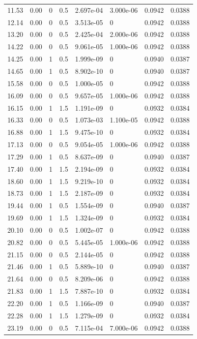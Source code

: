 \documentclass[preview]{standalone}
\begin{document}
{{\begin{tabular}{L{1.2cm}C{1.2cm} C{0.3cm}C{0.5cm} C{1.4cm}C{1.4cm} C{1.4cm}C{1.4cm}}
  11.53  &  0.00  & 0     & 0.5 &  2.697e-04  & 3.000e-06  & 0.0942 &  0.0388   \\ 
  12.14  &  0.00  & 0     & 0.5 &  3.513e-05  & 0  & 0.0942 &  0.0388   \\ 
  13.20  &  0.00  & 0     & 0.5 &  2.425e-04  & 2.000e-06  & 0.0942 &  0.0388   \\ 
  14.22  &  0.00  & 0     & 0.5 &  9.061e-05  & 1.000e-06  & 0.0942 &  0.0388   \\ 
  14.25  &  0.00  & 1     & 0.5 &  1.999e-09  & 0  & 0.0940 &  0.0387   \\ 
  14.65  &  0.00  & 1     & 0.5 &  8.902e-10  & 0  & 0.0940 &  0.0387   \\ 
  15.58  &  0.00  & 0     & 0.5 &  1.000e-05  & 0  & 0.0942 &  0.0388   \\ 
  16.09  &  0.00  & 0     & 0.5 &  9.657e-05  & 1.000e-06  & 0.0942 &  0.0388   \\ 
  16.15  &  0.00  & 1     & 1.5 &  1.191e-09  & 0  & 0.0932 &  0.0384   \\ 
  16.33  &  0.00  & 0     & 0.5 &  1.073e-03  & 1.100e-05  & 0.0942 &  0.0388   \\ 
  16.88  &  0.00  & 1     & 1.5 &  9.475e-10  & 0  & 0.0932 &  0.0384   \\ 
  17.13  &  0.00  & 0     & 0.5 &  9.054e-05  & 1.000e-06  & 0.0942 &  0.0388   \\ 
  17.29  &  0.00  & 1     & 0.5 &  8.637e-09  & 0  & 0.0940 &  0.0387   \\ 
  17.40  &  0.00  & 1     & 1.5 &  2.194e-09  & 0  & 0.0932 &  0.0384   \\ 
  18.60  &  0.00  & 1     & 1.5 &  9.219e-10  & 0  & 0.0932 &  0.0384   \\ 
  18.73  &  0.00  & 1     & 1.5 &  2.187e-09  & 0  & 0.0932 &  0.0384   \\ 
  19.44  &  0.00  & 1     & 0.5 &  1.554e-09  & 0  & 0.0940 &  0.0387   \\ 
  19.69  &  0.00  & 1     & 1.5 &  1.324e-09  & 0  & 0.0932 &  0.0384   \\ 
  20.10  &  0.00  & 0     & 0.5 &  1.002e-07  & 0  & 0.0942 &  0.0388   \\ 
  20.82  &  0.00  & 0     & 0.5 &  5.445e-05  & 1.000e-06  & 0.0942 &  0.0388   \\ 
  21.15  &  0.00  & 0     & 0.5 &  2.144e-05  & 0  & 0.0942 &  0.0388   \\ 
  21.46  &  0.00  & 1     & 0.5 &  5.889e-10  & 0  & 0.0940 &  0.0387   \\ 
  21.64  &  0.00  & 0     & 0.5 &  8.209e-06  & 0  & 0.0942 &  0.0388   \\ 
  21.83  &  0.00  & 1     & 1.5 &  7.887e-10  & 0  & 0.0932 &  0.0384   \\ 
  22.20  &  0.00  & 1     & 0.5 &  1.166e-09  & 0  & 0.0940 &  0.0387   \\ 
  22.28  &  0.00  & 1     & 1.5 &  1.279e-09  & 0  & 0.0932 &  0.0384   \\ 
  23.19  &  0.00  & 0     & 0.5 &  7.115e-04  & 7.000e-06  & 0.0942 &  0.0388   \\ 
\hline 
\end{tabular} 

}}
\end{document}
